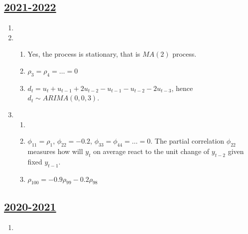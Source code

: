 \subsection[2021-2022]{\hyperref[sec:kr_03_2021_2022]{2021-2022}}
\label{sec:sol_kr_03_2021_2022} %



\begin{enumerate}

\item 

\item 
\begin{enumerate}
    \item Yes, the process is stationary, that is $MA(2)$ process. 
    \item $\rho_3 = \rho_4 = \ldots = 0$
    \item $d_t = u_t + u_{t-1} + 2u_{t-2} - u_{t-1} - u_{t-2} - 2 u_{t-3}$, hence $d_t \sim ARIMA(0, 0, 3)$.
\end{enumerate}

\item 
\begin{enumerate}
    \item 
    \item $\phi_{11} = \rho_1$, $\phi_{22} = -0.2$, $\phi_{33} = \phi_{44} = \ldots = 0$. 
    The partial correlation $\phi_{22}$ measures how will $y_t$ on average react to the unit change of $y_{t-2}$ given fixed $y_{t-1}$.
    \item $\rho_{100} = -0.9 \rho_{99} - 0.2 \rho_{98}$
\end{enumerate}

\end{enumerate}
    

\subsection[2020-2021]{\hyperref[sec:kr_03_2020_2021]{2020-2021}}
\label{sec:sol_kr_03_2020_2021} %



\begin{enumerate}
    
    
    
    \item
 
 
\end{enumerate}


